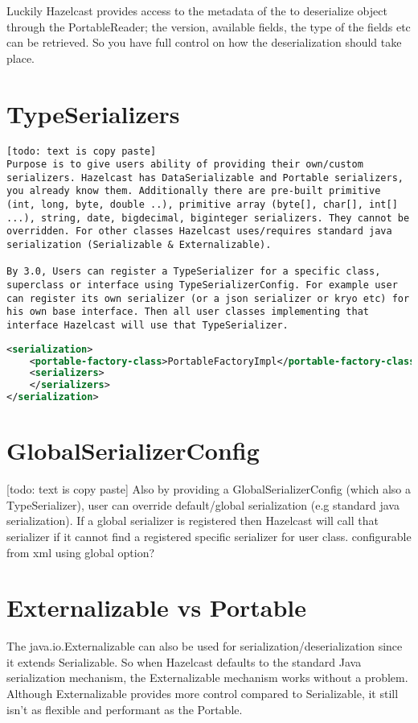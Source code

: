 Luckily Hazelcast provides access to the metadata of the to deserialize object through the PortableReader; the  version, available fields, the type of the fields etc can be retrieved. So you have full control on how the deserialization should take place. 

\section{TypeSerializers}

\begin{lstlisting}
[todo: text is copy paste]
Purpose is to give users ability of providing their own/custom serializers. Hazelcast has DataSerializable and Portable serializers, you already know them. Additionally there are pre-built primitive (int, long, byte, double ..), primitive array (byte[], char[], int[] ...), string, date, bigdecimal, biginteger serializers. They cannot be overridden. For other classes Hazelcast uses/requires standard java serialization (Serializable & Externalizable). 

By 3.0, Users can register a TypeSerializer for a specific class, superclass or interface using TypeSerializerConfig. For example user can register its own serializer (or a json serializer or kryo etc) for his own base interface. Then all user classes implementing that interface Hazelcast will use that TypeSerializer.
\end{lstlisting}

\begin{lstlisting}[language=xml]
<serialization>
    <portable-factory-class>PortableFactoryImpl</portable-factory-class>
    <serializers>
    </serializers>
</serialization>
\end{lstlisting}

\section{GlobalSerializerConfig}
[todo: text is copy paste]
Also by providing a GlobalSerializerConfig (which also a TypeSerializer), user can override default/global serialization (e.g standard java serialization). If a global serializer is registered then Hazelcast will call that serializer if it cannot find a registered specific serializer for user class. configurable from xml using global option?

\section{Externalizable vs Portable}
The java.io.Externalizable can also be used for serialization/deserialization since it extends Serializable. So when Hazelcast defaults to the standard Java serialization mechanism, the Externalizable mechanism works without a problem. Although Externalizable provides more control compared to Serializable, it still isn't as flexible and performant as the Portable.

